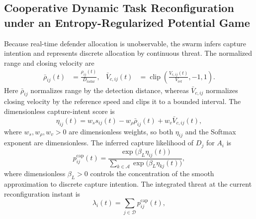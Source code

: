 \documentclass[unbranded]{cja}
\begin{document}
\subsection{Cooperative Dynamic Task Reconfiguration under an Entropy-Regularized Potential Game}

Because real-time defender allocation is unobservable, the swarm infers capture intention and represents discrete allocation by continuous threat. The normalized range and closing velocity are
\begin{equation}
\begin{aligned}
\bar\rho_{ij}(t)
&=\frac{\rho_{ij}(t)}{D_{\mathrm{radar}}},&
\bar V_{c,ij}(t)
&=\operatorname{clip}\!\left(
\frac{V_{c,ij}(t)}{V_{\mathrm{ref}}},
-1,1
\right).
\end{aligned}
\end{equation}
Here $\bar\rho_{ij}$ normalizes range by the detection distance, whereas $\bar V_{c,ij}$ normalizes closing velocity by the reference speed and clips it to a bounded interval.
The dimensionless capture-intent score is
\begin{equation}
\eta_{ij}(t)
=
w_s s_{ij}(t)
-
w_{\rho}\bar\rho_{ij}(t)
+
w_v \bar V_{c,ij}(t),
\end{equation}
where $w_s,w_{\rho},w_v>0$ are dimensionless weights, so both $\eta_{ij}$ and the Softmax exponent are dimensionless. The inferred capture likelihood of $D_j$ for $A_i$ is
\begin{equation}
p_{ij}^{\mathrm{cap}}(t)
=
\frac{\exp\!\bigl(\beta_L \eta_{ij}(t)\bigr)}
{\sum\limits_{k\in\mathcal{A}}\exp\!\bigl(\beta_L \eta_{kj}(t)\bigr)},
\label{eq:soft-lock-prob}
\end{equation}
where dimensionless $\beta_L>0$ controls the concentration of the smooth approximation to discrete capture intention. The integrated threat at the current reconfiguration instant is
\begin{equation}
\lambda_i(t)
=
\sum_{j\in\mathcal D}p_{ij}^{\mathrm{cap}}(t),
\label{eq:soft-lock-pressure}
\end{equation}
\end{document}
